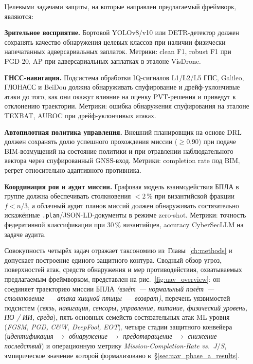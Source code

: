 Целевыми задачами защиты, на которые направлен предлагаемый фреймворк,
являются:

\noindent\textbf{Зрительное восприятие.} Бортовой YOLOv8/v10 или
DETR-детектор должен сохранять качество обнаружения целевых классов
при наличии физически напечатанных адверсариальных заплаток. Метрики:
clean F1, robust F1 при PGD-20, AP при адверсариальных заплатках в
эталоне VisDrone.

\noindent\textbf{ГНСС-навигация.} Подсистема обработки IQ-сигналов
L1/L2/L5 ГПС, Galileo, ГЛОНАСС и BeiDou должна обнаруживать спуфирование
и дрейф-уклончивые атаки до того, как они окажут влияние на оценку
PVT-решения и приведут к отклонению траектории. Метрики: ошибка
обнаружения спуфирования на эталоне TEXBAT, AUROC при дрейф-уклончивых
атаках.

\noindent\textbf{Автопилотная политика управления.} Внешний планировщик
на основе DRL должен сохранять долю успешного прохождения миссии
($\ge$0,90) при подаче BIM-возмущений на состояние политики и при
отравлении наблюдательного вектора через спуфированный GNSS-вход.
Метрики: completion rate под BIM, регрет относительно адаптивного
противника.

\noindent\textbf{Координация роя и аудит миссии.} Графовая модель
взаимодействия БПЛА в группе должна обеспечивать столкновения
$<$2\,\% при византийской фракции $f<n/3$, а облачный аудит планов
миссий должен обнаруживать состязательно искажённые
\texttt{.plan}/JSON-LD-документы в режиме zero-shot. Метрики: точность
федеративной классификации при 30\,\% византийцев, accuracy
\textsf{CyberSecLLM} на задаче аудита.

Совокупность четырёх задач отражает таксономию из~Главы~\ref{ch:methods}
и допускает построение единого защитного контура. Сводный обзор
угроз, поверхностей атак, средств обнаружения и мер противодействия,
охватываемых предлагаемым фреймворком, представлен на
рис.~\ref{fig:uav_overview}: он соединяет траекторию миссии БПЛА
\emph{(взлёт~--- нормальный полёт~--- столкновение~--- атака хищной
птицы~--- возврат)}, перечень уязвимостей подсистем
(\emph{связь, навигация, сенсоры, управление, питание, физический
уровень, ПО / ИИ, среда}), пять основных семейств состязательных
атак ML-уровня (\emph{FGSM, PGD, C\&W, DeepFool, EOT}), четыре стадии
защитного конвейера (\emph{идентификация $\to$ обнаружение $\to$
предотвращение $\to$ снижение последствий}) и операционную метрику
\emph{Mission-Completion-Rate vs.~$J/S$}, эмпирическое значение
которой формализовано в~\S\ref{sec:uav_phase_a_results}.

